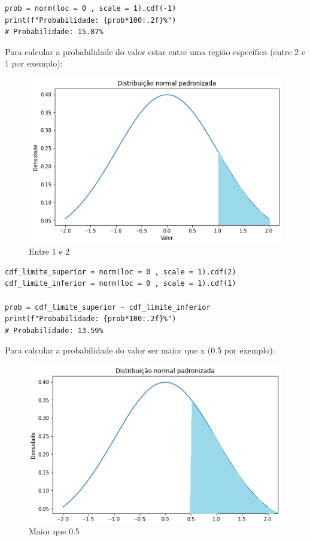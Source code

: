 \begin{verbatim}
prob = norm(loc = 0 , scale = 1).cdf(-1)
print(f"Probabilidade: {prob*100:.2f}%")
# Probabilidade: 15.87%
\end{verbatim}

Para calcular a probabilidade do valor estar entre uma região específica (entre 2 e 1 por exemplo):

\begin{figure}[H]
	\centering
	\includegraphics[width=1\textwidth]{./Imagens/Distribuição Normal/GA6.png} 
	\caption{Entre 1 e 2}
	\label{fig:GA6}
\end{figure}

\begin{verbatim}
cdf_limite_superior = norm(loc = 0 , scale = 1).cdf(2)
cdf_limite_inferior = norm(loc = 0 , scale = 1).cdf(1)

prob = cdf_limite_superior - cdf_limite_inferior
print(f"Probabilidade: {prob*100:.2f}%")
# Probabilidade: 13.59%
\end{verbatim}

Para calcular a probabilidade do valor ser maior que x (0.5 por exemplo): 

\begin{figure}[H]
	\centering
	\includegraphics[width=1\textwidth]{./Imagens/Distribuição Normal/GA7.png} 
	\caption{Maior que 0.5}
	\label{fig:GA7}
\end{figure}

